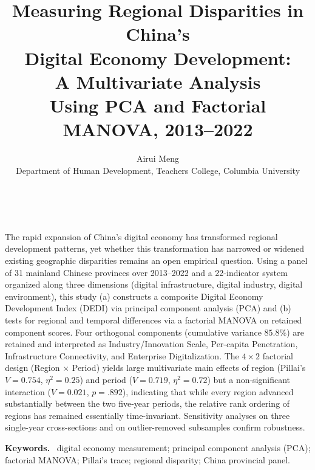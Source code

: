 \documentclass[12pt,letterpaper]{article}
\title{
    \vspace{4cm}
    \textbf{Measuring Regional Disparities in China's \\Digital Economy Development:\\
    A Multivariate Analysis \\ Using PCA and Factorial MANOVA, 2013--2022}
}
\author{
    Airui Meng\\[6pt]
    Department of Human Development, Teachers College, Columbia University
}
\date{}
\begin{document}
\vspace{4cm}
\maketitle
\thispagestyle{plain}

\newpage
\begin{center}
\begin{minipage}{0.92\textwidth}
 \,

\vspace{1cm}

The rapid expansion of China's digital economy has transformed regional development patterns, yet whether this transformation has narrowed or widened existing geographic disparities remains an open empirical question. Using a panel of 31 mainland Chinese provinces over 2013--2022 and a 22-indicator system organized along three dimensions (digital infrastructure, digital industry, digital environment), this study (a) constructs a composite Digital Economy Development Index (DEDI) via principal component analysis (PCA) and (b) tests for regional and temporal differences via a factorial MANOVA on retained component scores. Four orthogonal components (cumulative variance $85.8\%$) are retained
and interpreted as {Industry/Innovation Scale}, {Per-capita Penetration},
{Infrastructure Connectivity}, and {Enterprise Digitalization}. The
$4 \times 2$ factorial design (Region $\times$ Period) yields large multivariate main
effects of region (Pillai's $V=0.754$, $\eta^{2}=0.25$) and period
($V=0.719$, $\eta^{2}=0.72$) but a non-significant interaction
($V=0.021$, $p=.892$), indicating that while every region advanced substantially
between the two five-year periods, the relative rank ordering of regions has remained
essentially time-invariant. Sensitivity analyses on three single-year cross-sections
and on outlier-removed subsamples confirm robustness.

\vspace{0.5em}
\noindent\textbf{Keywords.} \, digital economy measurement; principal component analysis (PCA);
factorial MANOVA; Pillai's trace; regional disparity; China provincial panel.
\end{minipage}
\end{center}

\vspace{1em}
\newpage
\end{document}
